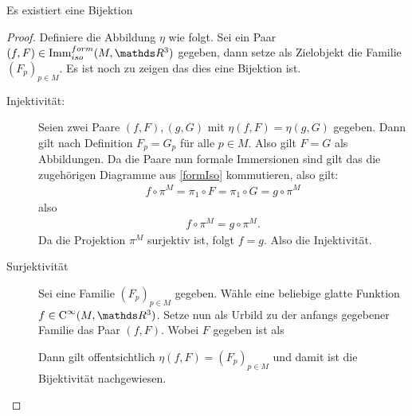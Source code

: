 \begin{Lem}\label{lem:famiso}
  Es existiert eine Bijektion
	
  \begin{proof}
    Definiere die Abbildung $ \eta $ wie folgt. Sei ein Paar
    $ (f,F) \in \Immfi{M}{\R^3}$ gegeben, dann setze als Zielobjekt
    die Familie $ (F_p)_{p\in M} $. Es ist noch zu zeigen
    das dies eine Bijektion ist.
    \begin{description}
    \item[Injektivität:] Seien zwei Paare $ (f,F),(g,G) $ mit
      $ \eta(f,F)=\eta(g,G) $ gegeben. Dann gilt nach Definition
      $ F_p = G_p $ für alle $ p\in M $. Also gilt $ F=G $ als
      Abbildungen. Da die Paare nun formale Immersionen sind gilt das
      die zugehörigen Diagramme aus \cref{formIso} kommutieren, also
      gilt:
      \begin{gather*}
        f \circ \pi^M = \pi_1 \circ F = \pi_1 \circ G = g \circ \pi^M
      \end{gather*}
      also
      \begin{gather*}
        f \circ \pi^M = g \circ \pi^M.
      \end{gather*}  Da die Projektion $ \pi^M $ surjektiv ist, folgt
      $ f=g $.  Also die Injektivität.
    \item[Surjektivität] Sei eine Familie $ (F_p)_{p\in M} $
      gegeben. Wähle eine beliebige glatte Funktion
      $ f\in \Cinfty{M}{\R^3} $. Setze nun als Urbild zu der anfangs
      gegebener Familie das Paar $ (f,F) $. Wobei $ F $ gegeben ist als
			 
      Dann gilt offentsichtlich $ \eta(f,F)=(F_p)_{p\in M} $ und damit
      ist die Bijektivität nachgewiesen.
    \end{description}
  \end{proof}
\end{Lem}

